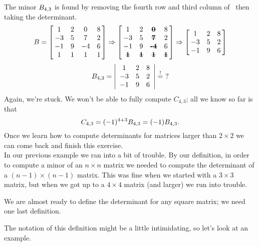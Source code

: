 {The minor $\ttb_{4,3}$ is found by removing the fourth row and third column of \ttb\ then taking the determinant.
$$\ttb = \bmx{cccc}1&2&0&8\\-3&5&7&2\\-1&9&-4&6\\1&1&1&1\emx \Rightarrow \bmx{cccc}1&2&\textbf{\sout{0}}&8\\-3&5&\textbf{\sout{7}}&2\\-1&9&\textbf{\sout{-4}}&6\\ \textbf{\sout{1}}&\textbf{\sout{1}}&\textbf{\sout{1}}&\textbf{\sout{1}}\emx \Rightarrow \bmx{ccc}1&2&8\\-3&5&2\\-1&9&6\emx$$
$$\ttb_{4,3} = \bdt{ccc}1&2&8\\-3&5&2\\-1&9&6\edt \stackrel{!}{=}\ ?$$
Again, we're stuck. We won't be able to fully compute $C_{4,3}$; all we know so far is that
$$C_{4,3} = (-1)^{4+3}\ttb_{4,3} = (-1)\ttb_{4,3}.$$ Once we learn how to compute determinants for matrices larger than $2\times 2$ we can come back and finish this exercise.}\\ %

In our previous example we ran into a bit of trouble. By our definition, in order to compute a minor of an $n\times n$ matrix we needed to compute the determinant of a $(n-1)\times(n-1)$ matrix. This was fine when we started with a $3\times3$ matrix, but when we got up to a $4\times4$ matrix (and larger) we run into trouble.

We are almost ready to define the determinant for any square matrix; we need one last definition.


The notation of this definition might be a little intimidating, so let's look at an example.\\


